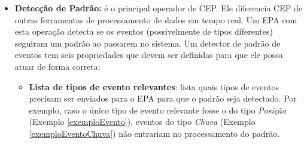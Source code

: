 \begin{itemize}
\item \textbf{Detecção de Padrão:} é o principal operador de CEP. Ele diferencia CEP de outras ferramentas de processamento de dados em tempo real. Um EPA com esta operação detecta se os eventos (possivelmente de tipos diferentes) seguiram um padrão ao passarem no sistema. Um detector de padrão de eventos tem seis propriedades que devem ser definidas para que ele possa atuar de forma correta: 
\begin{itemize}
\item \textbf{Lista de tipos de evento relevantes}: lista quais tipos de eventos precisam ser enviados para o EPA para que o padrão seja detectado. %
Por exemplo, caso o único tipo de evento relevante fosse o do tipo \textit{Posição} (Exemplo \ref{exemploEvento}), eventos do tipo \textit{Chuva} (Exemplo \ref{exemploEventoChuva}) não entrariam no processamento do padrão. 



\end{itemize}
\end{itemize}
